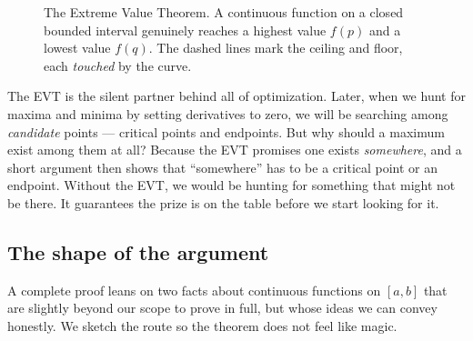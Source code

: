 \begin{figure}[H]
\centering
{}
\caption{The Extreme Value Theorem. A continuous function on a closed bounded interval
genuinely reaches a highest value $f(p)$ and a lowest value $f(q)$. The dashed lines mark
the ceiling and floor, each \emph{touched} by the curve.}
\label{ch08:fig-evt}
\end{figure}

\begin{focusbox}
The EVT is the silent partner behind all of optimization. Later, when we hunt for maxima
and minima by setting derivatives to zero, we will be searching among \emph{candidate}
points --- critical points and endpoints. But why should a maximum exist among them at all?
Because the EVT promises one exists \emph{somewhere}, and a short argument then shows that
``somewhere'' has to be a critical point or an endpoint. Without the EVT, we would be
hunting for something that might not be there. It guarantees the prize is on the table
before we start looking for it.
\end{focusbox}

\subsection{The shape of the argument}

A complete proof leans on two facts about continuous functions on $[a,b]$ that are slightly
beyond our scope to prove in full, but whose ideas we can convey honestly. We sketch the
route so the theorem does not feel like magic.

